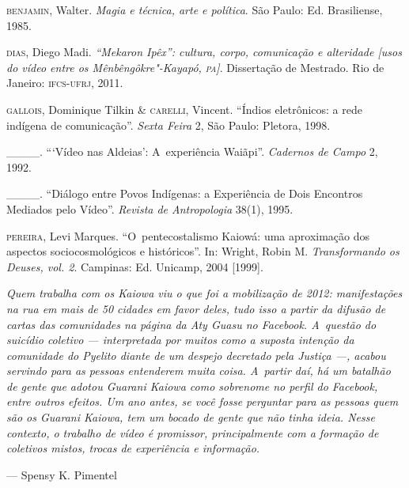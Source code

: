 \begin{Parskip}
\textsc{benjamin}, Walter. \emph{Magia e técnica, arte e política}. São Paulo: Ed.
Brasiliense, 1985.

\textsc{dias}, Diego Madi. \emph{``Mekaron Ipêx'': cultura, corpo, comunicação e
alteridade [usos do vídeo entre os Mênbêngôkre"-Kayapó, \textsc{pa}]}. Dissertação
de Mestrado. Rio de Janeiro: \textsc{ifcs}-\textsc{ufrj}, 2011. 

\textsc{gallois}, Dominique Tilkin \& \textsc{carelli}, Vincent. ``Índios eletrônicos: a
rede indígena de comunicação''. \emph{Sexta Feira} 2, São Paulo: Pletora, 1998.

\_\_\_\_. ```Vídeo nas Aldeias': A~experiência Waiãpi''. \emph{Cadernos de Campo} 2,
1992.

\_\_\_\_. ``Diálogo entre Povos Indígenas: a Experiência de Dois Encontros
Mediados pelo Vídeo''. \emph{Revista de Antropologia} 38(1), 1995.

\smallskip
\begin{absolutelynopagebreak}
\textsc{pereira}, Levi Marques. ``O~pentecostalismo Kaiowá: uma aproximação dos
aspectos sociocosmológicos e históricos''. In: Wright, Robin M.
\emph{Transformando os Deuses, vol. 2}. Campinas: Ed. Unicamp, 2004 [1999].
\end{absolutelynopagebreak}
\end{Parskip}

\clearpage

\vspace*{\fill}

\begin{flushright}
\begin{minipage}[c]{0.85\textwidth}
\raggedleft
\footnotesize
\emph{Quem trabalha com os Kaiowa viu o que foi a mobilização de 2012:
manifestações na rua em mais de 50 cidades em favor deles, tudo isso a
partir da difusão de cartas das comunidades na página da Aty Guasu no
Facebook. A~questão do suicídio coletivo --- interpretada por muitos como
a suposta intenção da comunidade do Pyelito diante de um despejo
decretado pela Justiça ---, acabou servindo para as pessoas entenderem
muita coisa. A~partir daí, há um batalhão de gente que adotou Guarani
Kaiowa como sobrenome no perfil do Facebook, entre outros efeitos. Um
ano antes, se você fosse perguntar para as pessoas quem são os Guarani
Kaiowa, tem um bocado de gente que não tinha ideia. Nesse contexto, o
trabalho de vídeo é promissor, principalmente com a formação de
coletivos mistos, trocas de experiência e informação.}

\smallskip
\hspace*{\fill}--- Spensy K. Pimentel
\end{minipage}
\end{flushright}

